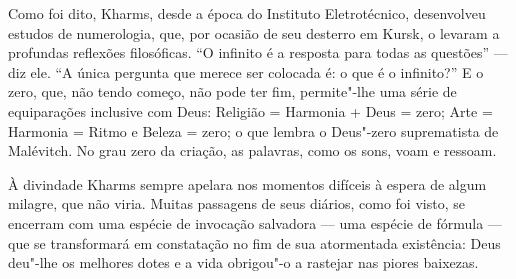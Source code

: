 {Como foi dito, Kharms, desde a época do Instituto Eletrotécnico,
desenvolveu estudos de numerologia, que, por ocasião de seu desterro em
Kursk, o levaram a profundas reflexões filosóficas. ``O infinito é a
resposta para todas as questões'' --- diz ele. ``A única pergunta que
merece ser colocada é: o que é o infinito?'' E o zero, que, não tendo
começo, não pode ter fim, permite"-lhe uma série de equiparações
inclusive com Deus: Religião = Harmonia + Deus = zero; Arte = Harmonia =
Ritmo e Beleza = zero; o que lembra o Deus"-zero suprematista de
Malévitch. No grau zero da criação, as palavras, como os sons, voam e
ressoam.

À divindade Kharms sempre apelara nos momentos difíceis à espera de
algum milagre, que não viria. Muitas passagens de seus diários, como foi
visto, se encerram com uma espécie de invocação salvadora --- uma espécie
de fórmula --- que se transformará em constatação no fim de sua
atormentada existência: Deus deu"-lhe os melhores dotes e a vida
obrigou"-o a rastejar nas piores baixezas.









}

